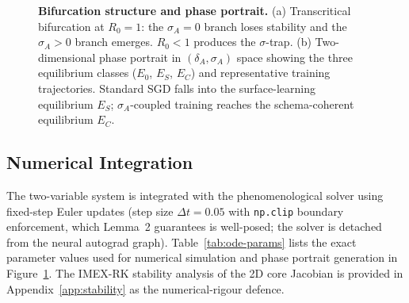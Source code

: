 \documentclass{article}
\providecommand{\Description}[1]{}
\theoremstyle{definition}
\begin{document}
\begin{figure}[htbp]
\centering
\resizebox{0.95\textwidth}{!}{}
\caption{\textbf{Bifurcation structure and phase portrait.}
(a) Transcritical bifurcation at $R_0 = 1$: the $\sigma_A = 0$ branch
loses stability and the $\sigma_A > 0$ branch emerges. $R_0 < 1$
produces the $\sigma$-trap. (b) Two-dimensional phase portrait in
$(\delta_A, \sigma_A)$ space showing the three equilibrium classes
($E_0$, $E_S$, $E_C$) and representative training trajectories.
Standard SGD falls into the surface-learning equilibrium $E_S$;
$\sigma_A$-coupled training reaches the schema-coherent equilibrium
$E_C$.}
\Description{Two-panel figure. Panel (a): Bifurcation diagram showing sigma_A vs R_0. A solid line shows stable sigma=0 branch for R_0<1, which becomes dashed (unstable) after R_0=1. A stable positive-sigma branch emerges after the transcritical bifurcation point. Panel (b): 2D phase portrait in delta_A-sigma_A space with three equilibria marked (E_0 origin, E_S surface-learning trap at high delta/low sigma, E_C target at high delta/high sigma), delta and sigma nullclines, and two representative trajectories (SGD falls to E_S, sigma-coupled reaches E_C).}
\label{fig:bifurcation}
\end{figure}

\subsection{Numerical Integration}\label{sec:numerical-protocol}

The two-variable system is integrated with the phenomenological solver
using fixed-step Euler updates (step size $\Delta t = 0.05$ with
\texttt{np.clip} boundary enforcement, which Lemma~2 guarantees is
well-posed; the solver is detached from the neural autograd graph). Table~\ref{tab:ode-params} lists the exact parameter values used for numerical simulation and phase portrait generation in Figure~\ref{fig:bifurcation}. The
IMEX-RK stability analysis of the 2D core Jacobian is provided in
Appendix~\ref{app:stability} as the numerical-rigour defence.
\end{document}
